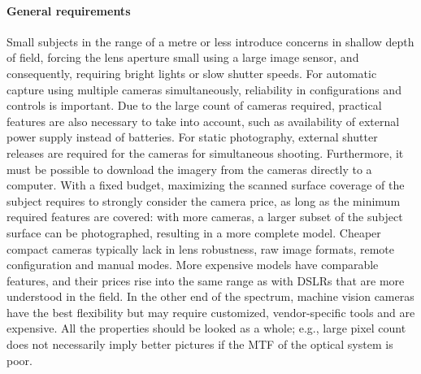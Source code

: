 \paragraph{General requirements}
Small subjects in the range of a metre or less introduce concerns in shallow depth of field, forcing the lens aperture small using a large image sensor, and consequently, requiring bright lights or slow shutter speeds.
For automatic capture using multiple cameras simultaneously, reliability in configurations and controls is important.
Due to the large count of cameras required, practical features are also necessary to take into account, such as availability of external power supply instead of batteries.
For static photography, external shutter releases are required for the cameras for simultaneous shooting.
Furthermore, it must be possible to download the imagery from the cameras directly to a computer.
With a fixed budget, maximizing the scanned surface coverage of the subject requires to strongly consider the camera price, as long as the minimum required features are covered: with more cameras, a larger subset of the subject surface can be photographed, resulting in a more complete model.
Cheaper compact cameras typically lack in lens robustness, raw image formats, remote configuration and manual modes.
More expensive models have comparable features, and their prices rise into the same range as with DSLRs that are more understood in the field.
In the other end of the spectrum, machine vision cameras have the best flexibility but may require customized, vendor-specific tools and are expensive.
All the properties should be looked as a whole; e.g., large pixel count does not necessarily imply better pictures if the MTF of the optical system is poor.

